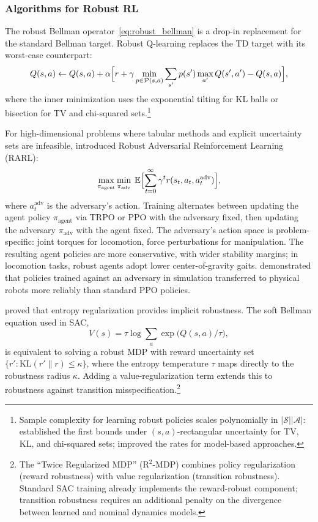 \subsubsection{Algorithms for Robust RL}
\label{subsubsec:robust_algorithms}

The robust Bellman operator~\eqref{eq:robust_bellman} is a drop-in
replacement for the standard Bellman target. Robust Q-learning replaces
the TD target with its worst-case counterpart:
\begin{equation}
  Q(s,a) \leftarrow Q(s,a) + \alpha\Bigl[
    r + \gamma \min_{p \in \mathcal{P}(s,a)} \sum_{s'} p(s')
    \max_{a'} Q(s',a') - Q(s,a)
  \Bigr],
  \label{eq:robust_q_learning}
\end{equation}
where the inner minimization uses the exponential tilting for KL balls or
bisection for TV and chi-squared
sets.\footnote{Sample complexity for learning robust policies scales
polynomially in $|\mathcal{S}||\mathcal{A}|$: \citet{Panaganti2022}
established the first bounds under $(s,a)$-rectangular uncertainty for TV,
KL, and chi-squared sets; \citet{clavier2024robust} improved the rates for
model-based approaches.}

For high-dimensional problems where tabular methods and explicit
uncertainty sets are infeasible, \citet{Pinto2017} introduced Robust
Adversarial Reinforcement Learning (RARL):
\begin{equation}
  \max_{\pi_{\text{agent}}} \min_{\pi_{\text{adv}}} \;
  \mathbb{E}\Bigl[\sum_{t=0}^\infty \gamma^t
    r(s_t, a_t, a_t^{\text{adv}})
  \Bigr],
  \label{eq:rarl}
\end{equation}
where $a_t^{\text{adv}}$ is the adversary's action. Training alternates
between updating the agent policy $\pi_{\text{agent}}$ via TRPO or PPO
with the adversary fixed, then updating the adversary
$\pi_{\text{adv}}$ with the agent fixed. The adversary's action space is
problem-specific: joint torques for locomotion, force perturbations for
manipulation. The resulting agent policies are more conservative, with
wider stability margins; in locomotion tasks, robust agents adopt lower
center-of-gravity gaits. \citet{Pinto2017} demonstrated that policies
trained against an adversary in simulation transferred to physical robots
more reliably than standard PPO policies.

\citet{Derman2021} proved that entropy regularization provides implicit
robustness. The soft Bellman equation used in SAC,
\begin{equation}
  V(s) = \tau \log \sum_a \exp\bigl(Q(s,a)/\tau\bigr),
  \label{eq:soft_bellman}
\end{equation}
is equivalent to solving a robust MDP with reward uncertainty set
$\{r' : \text{KL}(r' \| r) \leq \kappa\}$, where the entropy temperature
$\tau$ maps directly to the robustness radius $\kappa$. Adding a
value-regularization term extends this to robustness against transition
misspecification.\footnote{The ``Twice Regularized MDP'' (R$^2$-MDP)
combines policy regularization (reward robustness) with value
regularization (transition robustness). Standard SAC training already
implements the reward-robust component; transition robustness requires an
additional penalty on the divergence between learned and nominal dynamics
models.}

